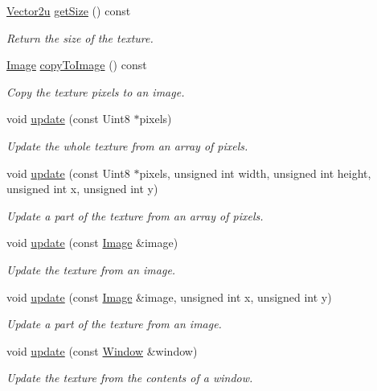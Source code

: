 \begin{DoxyCompactItemize}
\hyperlink{classsf_1_1_vector2}{Vector2u} \hyperlink{classsf_1_1_texture_a0f370acd8f41c8b97a6959389c521c2c}{get\+Size} () const 
\begin{DoxyCompactList}\small\item\em Return the size of the texture. \end{DoxyCompactList}\item 
\hyperlink{classsf_1_1_image}{Image} \hyperlink{classsf_1_1_texture_aefc19bcd95565dd2348fd4cec0facddc}{copy\+To\+Image} () const 
\begin{DoxyCompactList}\small\item\em Copy the texture pixels to an image. \end{DoxyCompactList}\item 
void \hyperlink{classsf_1_1_texture_ae4eab5c6781316840b0c50ad08370963}{update} (const Uint8 $\ast$pixels)
\begin{DoxyCompactList}\small\item\em Update the whole texture from an array of pixels. \end{DoxyCompactList}\item 
void \hyperlink{classsf_1_1_texture_a1352d8e16c2aeb4df586ed65dd2c36b9}{update} (const Uint8 $\ast$pixels, unsigned int width, unsigned int height, unsigned int x, unsigned int y)
\begin{DoxyCompactList}\small\item\em Update a part of the texture from an array of pixels. \end{DoxyCompactList}\item 
void \hyperlink{classsf_1_1_texture_a037cdf171af0fb392d07626a44a4ea17}{update} (const \hyperlink{classsf_1_1_image}{Image} \&image)
\begin{DoxyCompactList}\small\item\em Update the texture from an image. \end{DoxyCompactList}\item 
void \hyperlink{classsf_1_1_texture_a87f916490b757fe900798eedf3abf3ba}{update} (const \hyperlink{classsf_1_1_image}{Image} \&image, unsigned int x, unsigned int y)
\begin{DoxyCompactList}\small\item\em Update a part of the texture from an image. \end{DoxyCompactList}\item 
void \hyperlink{classsf_1_1_texture_ad3cceef238f7d5d2108a98dd38c17fc5}{update} (const \hyperlink{classsf_1_1_window}{Window} \&window)
\begin{DoxyCompactList}\small\item\em Update the texture from the contents of a window. \end{DoxyCompactList}\item 

\end{DoxyCompactItemize}
